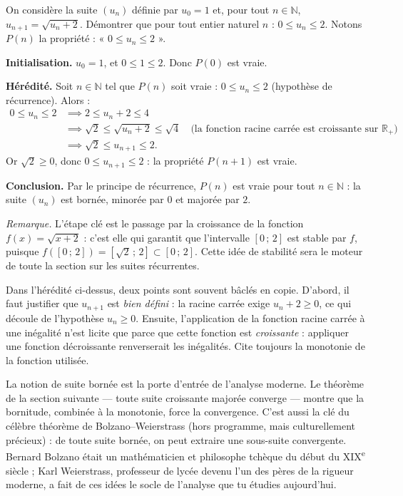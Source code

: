 \documentclass[11pt]{article}
\newcommand{\cle}[1]{{\popxbold\color{popdark}#1}}
\begin{document}
\begin{exoresolu}
On considère la suite $(u_n)$ définie par $u_0 = 1$ et, pour tout $n \in \mathbb{N}$, $u_{n+1} = \sqrt{u_n + 2}$. Démontrer que pour tout entier naturel $n$ : $0 \le u_n \le 2$.
\tcblower
Notons $P(n)$ la propriété : « $0 \le u_n \le 2$ ».

\textbf{Initialisation.} $u_0 = 1$, et $0 \le 1 \le 2$. Donc $P(0)$ est vraie.

\textbf{Hérédité.} Soit $n \in \mathbb{N}$ tel que $P(n)$ soit vraie : $0 \le u_n \le 2$ (hypothèse de récurrence). Alors :
\begin{align*}
0 \le u_n \le 2 &\implies 2 \le u_n + 2 \le 4 \\
&\implies \sqrt{2} \le \sqrt{u_n + 2} \le \sqrt{4} \quad \text{(la fonction racine carrée est croissante sur } \mathbb{R}_+\text{)} \\
&\implies \sqrt{2} \le u_{n+1} \le 2.
\end{align*}
Or $\sqrt{2} \ge 0$, donc $0 \le u_{n+1} \le 2$ : la propriété $P(n+1)$ est vraie.

\textbf{Conclusion.} Par le principe de récurrence, $P(n)$ est vraie pour tout $n \in \mathbb{N}$ : la suite $(u_n)$ est bornée, minorée par $0$ et majorée par $2$.

\emph{Remarque.} L'étape clé est le passage par la croissance de la fonction $f(x) = \sqrt{x+2}$ : c'est elle qui garantit que l'intervalle $[0\,;\,2]$ est \cle{stable} par $f$, puisque $f([0\,;\,2]) = [\sqrt{2}\,;\,2] \subset [0\,;\,2]$. Cette idée de stabilité sera le moteur de toute la section sur les suites récurrentes.
\end{exoresolu}

\begin{attention}
Dans l'hérédité ci-dessus, deux points sont souvent bâclés en copie. D'abord, il faut justifier que $u_{n+1}$ est \emph{bien défini} : la racine carrée exige $u_n + 2 \ge 0$, ce qui découle de l'hypothèse $u_n \ge 0$. Ensuite, l'application de la fonction racine carrée à une inégalité n'est licite que parce que cette fonction est \emph{croissante} : appliquer une fonction décroissante renverserait les inégalités. Cite toujours la monotonie de la fonction utilisée.
\end{attention}

\begin{savaistu}
La notion de suite bornée est la porte d'entrée de l'analyse moderne. Le théorème de la section suivante — toute suite croissante majorée converge — montre que la bornitude, combinée à la monotonie, force la convergence. C'est aussi la clé du célèbre théorème de Bolzano–Weierstrass (hors programme, mais culturellement précieux) : de toute suite bornée, on peut extraire une sous-suite convergente. Bernard Bolzano était un mathématicien et philosophe tchèque du début du XIX\textsuperscript{e} siècle ; Karl Weierstrass, professeur de lycée devenu l'un des pères de la rigueur moderne, a fait de ces idées le socle de l'analyse que tu étudies aujourd'hui.
\end{savaistu}
\end{document}
